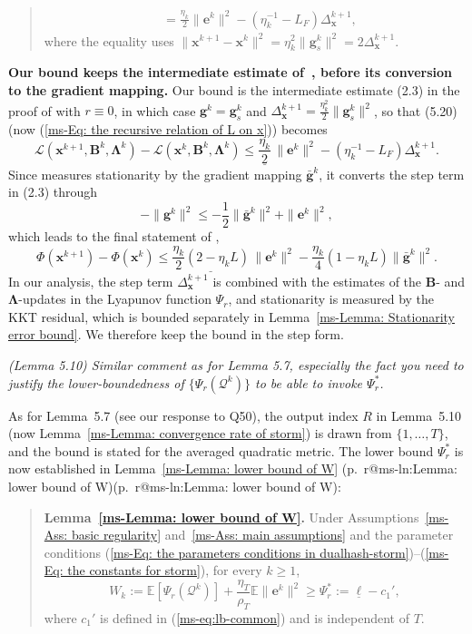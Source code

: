 \documentclass[11pt]{article}
\makeatletter
\newcommand{\mref}[1]{\ref*{ms-#1}}
\newcommand{\mpage}[1]{\pageref*{ms-#1}}
\newcommand{\meq}[1]{(\mref{#1})}
\newcommand{\mhasline}[1]{\ifcsname r@ms-ln:#1\endcsname\expandafter\@firstoftwo\else\expandafter\@secondoftwo\fi}
\newcommand{\mline}[1]{\getrefnumber{ms-ln:#1}}
\newcommand{\mpl}[1]{p.~\mpage{#1}\mhasline{#1}{, line~\mline{#1}}{}}
\newcommand{\EE}{\mathbb{E}}
\newcommand{\calL}{\mathcal{L}}
\newcommand{\calQ}{\mathcal{Q}}
\newcommand{\bB}{\bm{B}}
\newcommand{\bLmbd}{\bm{\Lambda}}
\newcommand{\bx}{\bm{x}}
\newcommand{\be}{\bm{e}}
\newcommand{\bg}{\bm{g}}
\newcommand{\blue}[1]{{\ifmmode\color{blue}#1\else\normalfont\upshape\color{blue}#1\fi}}
\newenvironment{bluequote}{\begin{quote}\normalfont\upshape\color{blue}}{\end{quote}}
\let\reviewitem\item
\newenvironment{qalist}{\begin{description}[leftmargin=0pt,labelindent=0pt,itemsep=0.8em,parsep=0.5em,font=\normalfont\upshape\bfseries]}{\end{description}}
\makeatother
\begin{document}
\begin{qalist}
\begin{enumerate}[label={[\roman*]},before=\let\item\reviewitem]
\begin{bluequote}
\begin{align*}
&=\frac{\eta_k}{2}\|\be^{k}\|^{2}-(\eta_k^{-1}-L_F)\Delta_{\bx}^{k+1},
\end{align*}
where the equality uses $\|\bx^{k+1}-\bx^{k}\|^{2}=\eta_k^{2}\|\bg_s^{k}\|^{2}=2\Delta_{\bx}^{k+1}$.
\end{bluequote}
\item \textbf{Our bound keeps the intermediate estimate of~\cite{xu2023momentum}, before its conversion to the gradient mapping.} Our bound is the intermediate estimate (2.3) in the proof of \cite[Lemma~2.1]{xu2023momentum} with $r\equiv0$, in which case $\bg^k=\bg_s^k$ and $\Delta_{\bx}^{k+1}=\frac{\eta_k^2}{2}\|\bg_s^k\|^2$, so that (5.20) (now \meq{Eq: the recursive relation of L on x}) becomes
\[
\calL(\bx^{k+1},\bB^{k},\bLmbd^{k})-\calL(\bx^{k},\bB^{k},\bLmbd^{k})\leq\underline{\frac{\eta_k}{2}}\,\|\be^{k}\|^{2}-(\eta_k^{-1}-L_F)\Delta_{\bx}^{k+1}.
\]
Since \cite{xu2023momentum} measures stationarity by the gradient mapping $\bar{\bg}^k$, it converts the step term in (2.3) through
\[
-\|\bg^k\|^2\leq-\frac12\|\bar{\bg}^k\|^2+\|\be^k\|^2,
\]
which leads to the final statement of \cite[Lemma~2.1]{xu2023momentum},
\[
\Phi(\bx^{k+1})-\Phi(\bx^k)\leq \underline{\frac{\eta_k}{2}(2-\eta_kL)}\,\|\be^k\|^2-\frac{\eta_k}{4}(1-\eta_kL)\|\bar{\bg}^k\|^2 .
\]
In our analysis, the step term $\Delta_{\bx}^{k+1}$ is combined with the estimates of the $\bB$- and $\bLmbd$-updates in the Lyapunov function $\Psi_r$, and stationarity is measured by the KKT residual, which is bounded separately in Lemma~\mref{Lemma: Stationarity error bound}. We therefore keep the bound in the step form.
\end{enumerate}

\item[{Q55.}] {\itshape (Lemma 5.10) Similar comment as for Lemma 5.7, especially the fact you need to justify the lower-boundedness of $\{\Psi_r(\calQ^k)\}$ to be able to invoke $\Psi_r^*$.}
\item[Response:] As for Lemma~5.7 (see our response to Q50), the output index $R$ in Lemma~5.10 (now Lemma~\mref{Lemma: convergence rate of storm}) is drawn from $\{1,\ldots,T\}$, and the bound is stated for the averaged quadratic metric. The lower bound $\Psi_r^*$ is now established in Lemma~\mref{Lemma: lower bound of W} \blue{(\mpl{Lemma: lower bound of W})}:
\begin{bluequote}
\textbf{Lemma~\mref{Lemma: lower bound of W}.} Under Assumptions~\mref{Ass: basic regularity} and~\mref{Ass: main assumptions} and the parameter conditions \meq{Eq: the parameters conditions in dualhash-storm}--\meq{Eq: the constants for storm}, for every $k\ge1$,
\[
W_k:=\EE[\Psi_r(\calQ^k)]+\frac{\eta_T}{\rho_T}\EE\|\be^k\|^2\ge\Psi_r^*:=\underline{\ell}-c_1',
\]
where $c_1'$ is defined in \meq{eq:lb-common} and is independent of $T$.
\end{bluequote}


\end{qalist}
\end{document}
